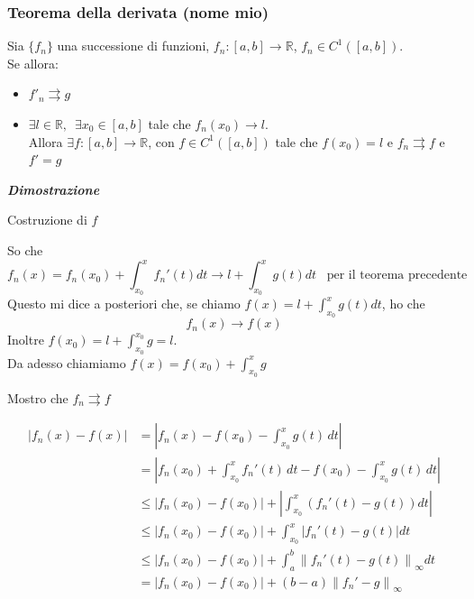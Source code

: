 \documentclass{article}
\theoremstyle{definition}
\newcommand{\R}{\mathbb{R}}
\begin{document}
\subsubsection{Teorema della derivata (nome mio)}
Sia $\{f_n\}$ una successione di funzioni, $f_n: [a,b] \to \R$, $f_n \in C^1([a,b])$.
\\
Se allora:
\begin{itemize}
    \item $f'_n \rightrightarrows g$
    \item $\exists l \in \R, \,\,\, \exists x_0 \in [a,b]$ tale che $f_n(x_0) \to l$.
    \\
    Allora $\exists f:[a,b] \to \R$, con $f \in C^1([a,b])$ tale che $f(x_0)=l$ e $f_n \rightrightarrows f$ e $f'=g$
\end{itemize}
\begin{center}
    \textbf{\textit{Dimostrazione}}
\end{center}
\begin{center}
    Costruzione di $f$
\end{center}
So che 
\begin{equation}
    f_n(x) = f_n(x_0)+\int_{x_0}^x f_n'(t)dt \to l + \int_{x_0}^x g(t)dt \,\,\,\,\, \mbox{per il teorema precedente}
\end{equation}
Questo mi dice a posteriori che, se chiamo $f(x)=l+\int_{x_0}^x g(t)dt$, ho che
\begin{equation}
    f_n(x) \to f(x)
\end{equation}
Inoltre $f(x_0)=l+\int_{x_0}^{x_0}g=l$.
\\
Da adesso chiamiamo $f(x)=f(x_0)+\int_{x_0}^x g$
\begin{center}
    Mostro che $f_n \rightrightarrows f$
\end{center}
\begin{center}
\begin{align*}
\left|f_n(x) - f(x)\right| 
&= \left|f_n(x) - f(x_0) - \int_{x_0}^x g(t)\,dt\right| \\
&= \left|f_n(x_0) + \int_{x_0}^x f_n'(t)\,dt - f(x_0) - \int_{x_0}^x g(t)\,dt\right| \\
&\leq \left|f_n(x_0) - f(x_0)\right| + \left| \int_{x_0}^x \left( f_n'(t) - g(t) \right) dt \right| \\
&\leq \left|f_n(x_0) - f(x_0)\right| + \int_{x_0}^x \left| f_n'(t) - g(t) \right| dt \\
&\leq \left|f_n(x_0) - f(x_0)\right| + \int_a^b \left\| f_n'(t) - g(t) \right\|_\infty dt \\
&= \left|f_n(x_0) - f(x_0)\right| + (b - a) \left\| f_n' - g \right\|_\infty
\end{align*}
\end{center}
\end{document}
